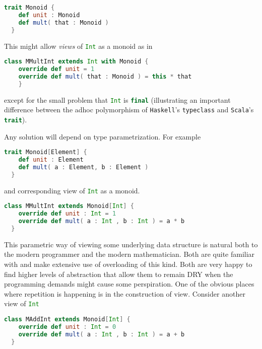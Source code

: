 \begin{lstlisting}[language=Scala]
  trait Monoid {
    def unit : Monoid
    def mult( that : Monoid ) 
  }
\end{lstlisting}

This might allow \emph{views} of \lstinline[language=Scala]!Int! as a monoid as in

\begin{lstlisting}[language=Scala]
  class MMultInt extends Int with Monoid {
    override def unit = 1
    override def mult( that : Monoid ) = this * that
    }
\end{lstlisting}

except for the small problem that \lstinline[language=Scala]!Int! is
\lstinline[language=Scala]!final! (illustrating an important
difference between the adhoc polymorphism of \texttt{Haskell}'s
\lstinline[language=Haskell]!typeclass! and \texttt{Scala}'s
\lstinline[language=Scala]!trait!).

Any solution will depend on type parametrization. For example

\begin{lstlisting}[language=Scala]
  trait Monoid[Element] {
    def unit : Element
    def mult( a : Element, b : Element ) 
  }
\end{lstlisting}

and corresponding view of \lstinline[language=Scala]!Int! as a monoid.

\begin{lstlisting}[language=Scala]
  class MMultInt extends Monoid[Int] {
    override def unit : Int = 1
    override def mult( a : Int , b : Int ) = a * b
  }
\end{lstlisting}

This parametric way of viewing some underlying data structure is
natural both to the modern programmer and the modern
mathematician. Both are quite familiar with and make extensive use of
overloading of this kind. Both are very happy to find higher levels of
abstraction that allow them to remain DRY when the programming demands
might cause some perspiration. One of the obvious places where
repetition is happening is in the construction of view. Consider
another view of \lstinline[language=Scala]!Int!

\begin{lstlisting}[language=Scala]
  class MAddInt extends Monoid[Int] {
    override def unit : Int = 0
    override def mult( a : Int , b : Int ) = a + b
  }
\end{lstlisting}


